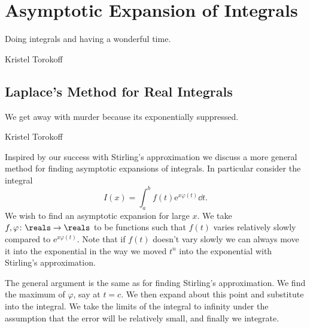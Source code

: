 \documentclass[fleqn]{NotesClass}
\newcommand*{\e}{\mathrm{e}}
\begin{document}
    \chapter{Asymptotic Expansion of Integrals}
    \epigraph{Doing integrals and having a wonderful time.}{Kristel Torokoff}
    \section{Laplace's Method for Real Integrals}
    \epigraph{We get away with murder because its exponentially suppressed.}{Kristel Torokoff}
    Inspired by our success with Stirling's approximation we discuss a more general method for finding asymptotic expansions of integrals.
    In particular consider the integral
    \begin{equation}
        I(x) = \int_a^b f(t) \e^{x\varphi(t)}\dd{t}.
    \end{equation}
    We wish to find an asymptotic expansion for large \(x\).
    We take \(f, \varphi \colon \reals\to\reals\) to be functions such that \(f(t)\) varies relatively slowly compared to \(\e^{x\varphi(t)}\).
    Note that if \(f(t)\) doesn't vary slowly we can always move it into the exponential in the way we moved \(t^n\) into the exponential with Stirling's approximation.
    
    The general argument is the same as for finding Stirling's approximation.
    We find the maximum of \(\varphi\), say at \(t = c\).
    We then expand about this point and substitute into the integral.
    We take the limits of the integral to infinity under the assumption that the error will be relatively small, and finally we integrate.
    
\end{document}
